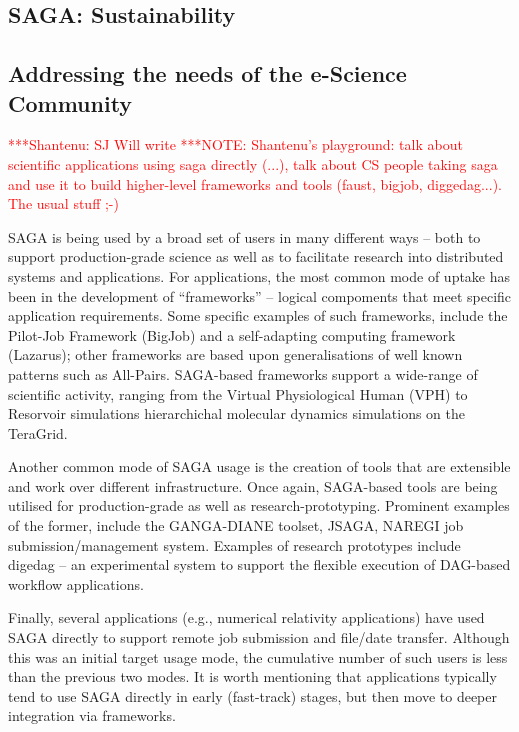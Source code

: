 \documentclass[a4paper,10pt]{article}
\newcommand{\note}[1]{ {\textcolor{red} { ***NOTE: #1 }}}
\newcommand{\jhanote}[1]{  {\textcolor{red}     { ***Shantenu: #1 }}}
\newcommand{\jhanote}[1]{}
\begin{document}

\subsection*{SAGA: Sustainability}

\subsection*{Addressing the needs of the e-Science Community}
\jhanote{SJ Will write} \note{Shantenu's playground: talk about
  scientific applications using saga directly (...), talk about CS
  people taking saga and use it to build higher-level frameworks and
  tools (faust, bigjob, diggedag...). The usual stuff ;-)}

SAGA is being used by a broad set of users in many different ways --
both to support production-grade science as well as to facilitate
research into distributed systems and applications.  For applications,
the most common mode of uptake has been in the development of
``frameworks'' -- logical compoments that meet specific application
requirements. Some specific examples of such frameworks, include the
Pilot-Job Framework (BigJob) and a self-adapting computing framework
(Lazarus); other frameworks are based upon generalisations of well
known patterns such as All-Pairs. SAGA-based frameworks support a
wide-range of scientific activity, ranging from the Virtual
Physiological Human (VPH) to Resorvoir simulations hierarchichal
molecular dynamics simulations on the TeraGrid.

Another common mode of SAGA usage is the creation of tools that are
extensible and work over different infrastructure. Once again,
SAGA-based tools are being utilised for production-grade as well as
research-prototyping. Prominent examples of the former, include the
GANGA-DIANE toolset, JSAGA, NAREGI job submission/management
system. Examples of research prototypes include digedag -- an
experimental system to support the flexible execution of DAG-based
workflow applications.

Finally, several applications (e.g., numerical relativity
applications) have used SAGA directly to support remote job submission
and file/date transfer. Although this was an initial target usage
mode, the cumulative number of such users is less than the previous
two modes. It is worth mentioning that applications typically tend to
use SAGA directly in early (fast-track) stages, but then move to
deeper integration via frameworks.
\end{document}
